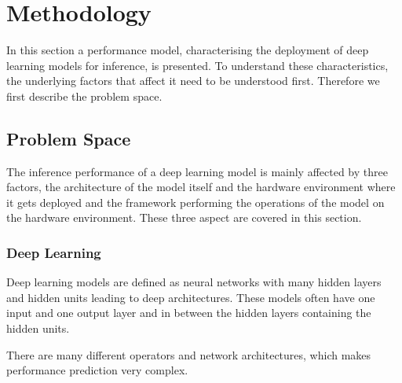\chapter{Methodology}
\label{chap:methodology}
In this section a performance model, characterising the deployment of deep learning models for inference, is presented. To understand these characteristics, the underlying factors that affect it need to be understood first. Therefore we first describe the problem space.


\section{Problem Space}
The inference performance of a deep learning model is mainly affected by three factors, the architecture of the model itself and the hardware environment where it gets deployed and the framework performing the operations of the model on the hardware environment.
These three aspect are covered in this section.


\subsection{Deep Learning}


Deep learning models are defined as neural networks with many hidden layers and hidden units leading to deep architectures.
These models often have one input and one output layer and in between the hidden layers containing the hidden units.

There are many different operators and network architectures, which makes performance prediction very complex.

